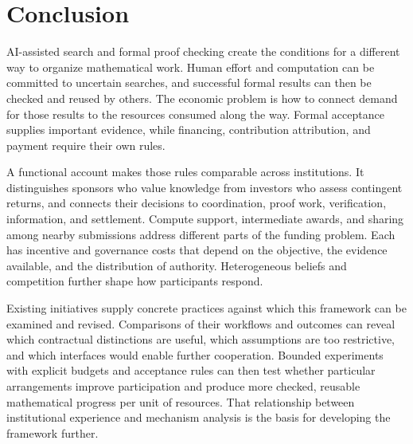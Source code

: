 \documentclass[11pt,a4paper]{article}
\begin{document}
\section{Conclusion}
AI-assisted search and formal proof checking create the conditions for a different way to organize mathematical work. Human effort and computation can be committed to uncertain searches, and successful formal results can then be checked and reused by others. The economic problem is how to connect demand for those results to the resources consumed along the way. Formal acceptance supplies important evidence, while financing, contribution attribution, and payment require their own rules.

A functional account makes those rules comparable across institutions. It distinguishes sponsors who value knowledge from investors who assess contingent returns, and connects their decisions to coordination, proof work, verification, information, and settlement. Compute support, intermediate awards, and sharing among nearby submissions address different parts of the funding problem. Each has incentive and governance costs that depend on the objective, the evidence available, and the distribution of authority. Heterogeneous beliefs and competition further shape how participants respond.

Existing initiatives supply concrete practices against which this framework can be examined and revised. Comparisons of their workflows and outcomes can reveal which contractual distinctions are useful, which assumptions are too restrictive, and which interfaces would enable further cooperation. Bounded experiments with explicit budgets and acceptance rules can then test whether particular arrangements improve participation and produce more checked, reusable mathematical progress per unit of resources. That relationship between institutional experience and mechanism analysis is the basis for developing the framework further.
\end{document}
